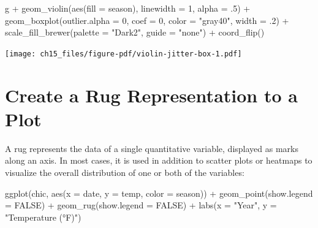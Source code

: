 \documentclass[
  letterpaper,
  DIV=11,
  numbers=noendperiod]{scrreprt}
\newenvironment{Shaded}{\begin{snugshade}}{\end{snugshade}}
\newcommand{\AttributeTok}[1]{\textcolor[rgb]{0.40,0.45,0.13}{#1}}
\newcommand{\ConstantTok}[1]{\textcolor[rgb]{0.56,0.35,0.01}{#1}}
\newcommand{\DecValTok}[1]{\textcolor[rgb]{0.68,0.00,0.00}{#1}}
\newcommand{\FunctionTok}[1]{\textcolor[rgb]{0.28,0.35,0.67}{#1}}
\newcommand{\NormalTok}[1]{\textcolor[rgb]{0.00,0.23,0.31}{#1}}
\newcommand{\SpecialCharTok}[1]{\textcolor[rgb]{0.37,0.37,0.37}{#1}}
\newcommand{\StringTok}[1]{\textcolor[rgb]{0.13,0.47,0.30}{#1}}
\begin{document}
\begin{Shaded}
\begin{Highlighting}[]
\NormalTok{g }\SpecialCharTok{+} \FunctionTok{geom\_violin}\NormalTok{(}\FunctionTok{aes}\NormalTok{(}\AttributeTok{fill =}\NormalTok{ season), }\AttributeTok{linewidth =} \DecValTok{1}\NormalTok{, }\AttributeTok{alpha =}\NormalTok{ .}\DecValTok{5}\NormalTok{) }\SpecialCharTok{+}
    \FunctionTok{geom\_boxplot}\NormalTok{(}\AttributeTok{outlier.alpha =} \DecValTok{0}\NormalTok{, }\AttributeTok{coef =} \DecValTok{0}\NormalTok{,}
                 \AttributeTok{color =} \StringTok{"gray40"}\NormalTok{, }\AttributeTok{width =}\NormalTok{ .}\DecValTok{2}\NormalTok{) }\SpecialCharTok{+}
    \FunctionTok{scale\_fill\_brewer}\NormalTok{(}\AttributeTok{palette =} \StringTok{"Dark2"}\NormalTok{, }\AttributeTok{guide =} \StringTok{"none"}\NormalTok{) }\SpecialCharTok{+}
    \FunctionTok{coord\_flip}\NormalTok{()}
\end{Highlighting}
\end{Shaded}

\texttt{[image: ch15\_files/figure-pdf/violin-jitter-box-1.pdf]}

\section{Create a Rug Representation to a
Plot}\label{create-a-rug-representation-to-a-plot}

A rug represents the data of a single quantitative variable, displayed
as marks along an axis. In most cases, it is used in addition to scatter
plots or heatmaps to visualize the overall distribution of one or both
of the variables:

\begin{Shaded}
\begin{Highlighting}[]
\FunctionTok{ggplot}\NormalTok{(chic, }\FunctionTok{aes}\NormalTok{(}\AttributeTok{x =}\NormalTok{ date, }\AttributeTok{y =}\NormalTok{ temp,}
                 \AttributeTok{color =}\NormalTok{ season)) }\SpecialCharTok{+}
  \FunctionTok{geom\_point}\NormalTok{(}\AttributeTok{show.legend =} \ConstantTok{FALSE}\NormalTok{) }\SpecialCharTok{+}
  \FunctionTok{geom\_rug}\NormalTok{(}\AttributeTok{show.legend =} \ConstantTok{FALSE}\NormalTok{) }\SpecialCharTok{+}
  \FunctionTok{labs}\NormalTok{(}\AttributeTok{x =} \StringTok{"Year"}\NormalTok{, }\AttributeTok{y =} \StringTok{"Temperature (°F)"}\NormalTok{)}
\end{Highlighting}
\end{Shaded}
\end{document}
